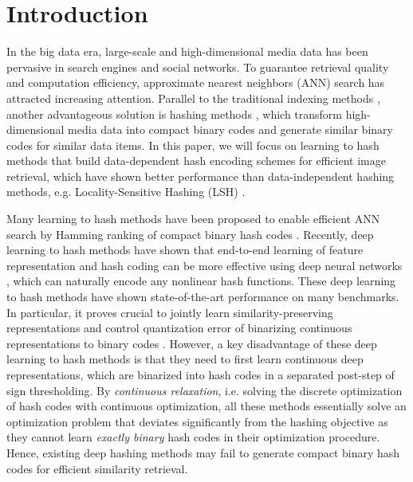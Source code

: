 \documentclass[10pt,twocolumn,letterpaper]{article}
\begin{document}
\section{Introduction}
In the big data era, large-scale and high-dimensional media data has been pervasive in search engines and social networks. To guarantee retrieval quality and computation efficiency, approximate nearest neighbors (ANN) search has attracted increasing attention. Parallel to the traditional indexing methods \cite{cite:TOMM06CBIR}, another advantageous solution is hashing methods \cite{cite:Arxiv14HashSurvey}, which transform high-dimensional media data into compact binary codes and generate similar binary codes for similar data items. In this paper, we will focus on learning to hash methods \cite{cite:Arxiv14HashSurvey} that build data-dependent hash encoding schemes for efficient image retrieval, which have shown better performance than data-independent hashing methods, e.g. Locality-Sensitive Hashing (LSH) \cite{cite:VLDB99LSH}.

Many learning to hash methods have been proposed to enable efficient ANN search by Hamming ranking of compact binary hash codes \cite{cite:NIPS09BRE,cite:CVPR11ITQ,cite:ICML11MLH,cite:CVPR12MIH,cite:CVPR12KSH,cite:TPAMI12SSH,cite:CVPR13HBS,cite:CVPR13BP,cite:ICML14CBE,cite:SIGIR14LFH}.
Recently, deep learning to hash methods \cite{cite:AAAI14CNNH,cite:CVPR15DNNH,cite:CVPR15SDH,cite:CVPR15DH,cite:AAAI16DHN,cite:IJCAI16DPSH,cite:CVPR2016DSH} have shown that end-to-end learning of feature representation and hash coding can be more effective using deep neural networks \cite{cite:NIPS12CNN,cite:TPAMI13DL}, which can naturally encode any nonlinear hash functions. These deep learning to hash methods have shown state-of-the-art performance on many benchmarks. In particular, it proves crucial to jointly learn similarity-preserving representations and control quantization error of binarizing continuous representations to binary codes \cite{cite:AAAI16DHN,cite:IJCAI16DPSH,cite:CVPR15DSRH,cite:CVPR2016DSH}. However, a key disadvantage of these deep learning to hash methods is that they need to first learn continuous deep representations, which are binarized into hash codes in a separated post-step of sign thresholding. By \emph{continuous relaxation}, i.e.  solving the discrete optimization of hash codes with continuous optimization, all these methods essentially solve an optimization problem that deviates significantly from the hashing objective as they cannot learn \emph{exactly binary} hash codes in their optimization procedure. Hence, existing deep hashing methods may fail to generate compact binary hash codes for efficient similarity retrieval.
\end{document}
